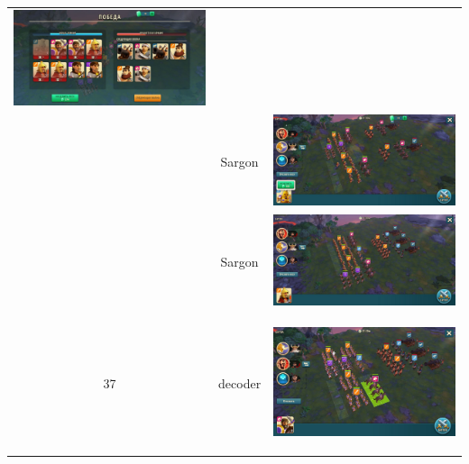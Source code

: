 \begin{longtable}{|c|c|c|}
	\includegraphics[width=0.75\linewidth]{./parts/media/TreasureHunt/37/sargon/photo_2022-04-07_13-16-57.jpg} \\
	& Sargon &
	\includegraphics[width=0.75\linewidth]{./parts/media/TreasureHunt/37/sargon/photo_2022-04-07_13-17-01.jpg} \\
	& Sargon &
	\includegraphics[width=0.75\linewidth]{./parts/media/TreasureHunt/37/sargon/photo_2022-04-07_13-16-49.jpg} \\
	\hline
	\multirow{8}{*}{37} & decoder &
	\hypertarget{fight37}{\includegraphics[width=0.75\linewidth]{./parts/media/TreasureHunt/37/decoder/photo_2022-04-14_12-36-24.jpg}} \\

\end{longtable}
